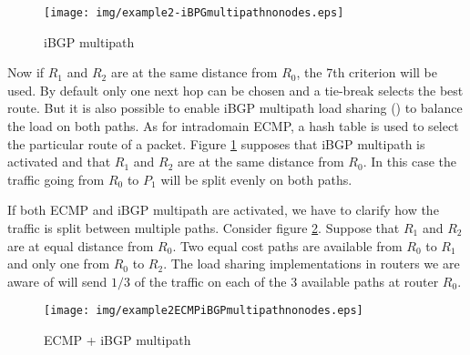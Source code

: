 \documentclass{acm_proc_article-sp}
\begin{document}
\begin{figure}[htbp]
  \centering
  \texttt{[image: img/example2-iBPGmultipathnonodes.eps]}
  \caption{iBGP multipath}
  \label{fig:example2iBGPmultipath}
\end{figure}

Now if $R_1$ and $R_2$ are at the same distance from $R_0$, the 7th 
criterion will be used. By default only one next hop can be chosen
and a tie-break selects the best route. But it is also possible to enable iBGP
multipath load sharing (\cite{bgp2,bgp3}) to balance the load on both paths. As for intradomain
ECMP, a hash table is used to select the particular route of a
packet. Figure \ref{fig:example2iBGPmultipath} supposes that iBGP
multipath is activated and that $R_1$ and $R_2$ are at the same
distance from $R_0$. In this case the traffic going from $R_0$ to
$P_1$ will be split evenly on both paths.

If both ECMP and iBGP multipath are activated,
we have to clarify how the traffic is split between multiple
paths. Consider figure \ref{fig:example2ecmpiBGPmultipath}.
Suppose that $R_1$ and $R_2$ are at equal distance from $R_0$. Two
equal cost paths are available from $R_0$ to $R_1$ and only one from
$R_0$ to $R_2$. 
The load sharing implementations in routers we are aware of will send $1/3$ 
of the traffic on each of the 3 available paths at router $R_0$. 

\begin{figure}[htbp]
  \centering
  \texttt{[image: img/example2ECMPiBGPmultipathnonodes.eps]}
  \caption{ECMP + iBGP multipath}
  \label{fig:example2ecmpiBGPmultipath}
\end{figure}
\end{document}
